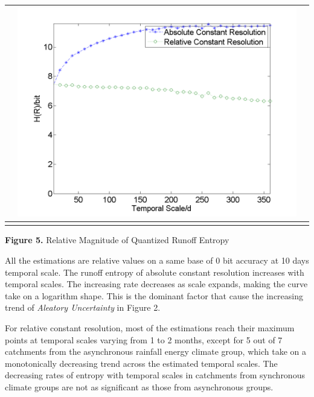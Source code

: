 \documentclass[draft,wrr]{AGUTeX}
\begin{document}
\begin{article}
\begin{table}[H]
{\begin{tabular}{ccc}
&\begin{minipage}{.6\textwidth}\includegraphics[width=\linewidth]{resultgraph/e11532500.png}\end{minipage}
\\
\hline
\\
\end{tabular}
}
\Large{\textbf{Figure 5.} Relative Magnitude of Quantized Runoff Entropy }
\end{table}

All the estimations are relative values on a same base of 0 bit accuracy at 10 days temporal scale. The runoff entropy of absolute constant resolution increases with temporal scales. The increasing rate decreases as scale expands, making the  curve take on a logarithm shape. This is the dominant factor that cause the increasing trend of \emph{Aleatory Uncertainty} in Figure 2. 

For relative constant resolution, most of the estimations reach their maximum points at temporal scales varying from    
1 to 2 months, except for 5 out of 7 catchments from the asynchronous rainfall energy climate group, which take on a monotonically decreasing trend across the estimated temporal scales. The decreasing rates of entropy with temporal scales in catchments from synchronous climate groups are not as significant as those from asynchronous groups. 

\end{article}
\end{document}
